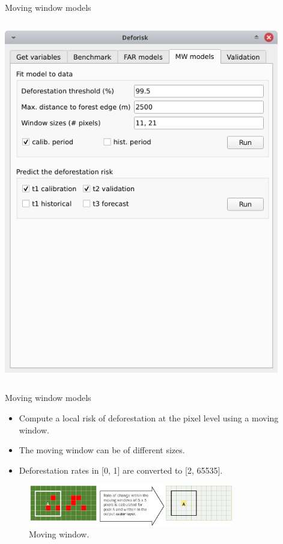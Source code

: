 \documentclass[10pt,table,dvipsnames,compress]{beamer}
\begin{document}
\begin{frame}[label={sec:orgd351244}]{Moving window models}
\begin{columns}
\begin{column}{0.45\columnwidth}
\begin{center}
\includegraphics[width=0.9\textwidth]{figs/plugin_api/interface_mw_models.png}
\end{center}
\end{column}
\end{columns}
\end{frame}

\begin{frame}[label={sec:org97be5e1}]{Moving window models}
\begin{itemize}
\item Compute a local risk of deforestation at the pixel level using a moving window.
\item The moving window can be of different sizes.
\item Deforestation rates in [0, 1] are converted to [2, 65535].
\end{itemize}

\begin{figure}[htbp]
\centering
\includegraphics[width=0.8\textwidth]{figs/moving_window.png}
\caption{Moving window.}
\end{figure}
\end{frame}
\end{document}
